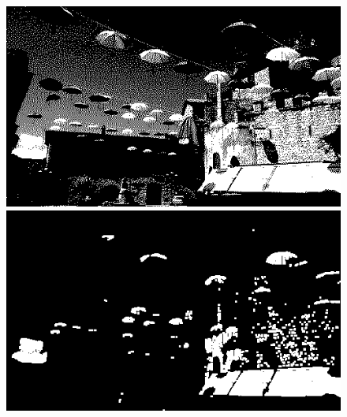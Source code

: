 \documentclass{article}
\begin{document}
	\begin{figure}[!ht]	
	\centering	
	\includegraphics[scale=1.2]{img/mono-obraz1}
	\includegraphics[scale=0.288]{img/morfologiczne/otwarcie-mono}
	

\end{figure}
\end{document}
